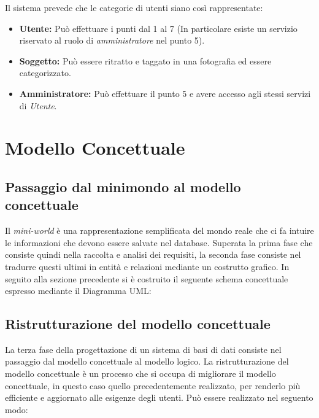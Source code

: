 \documentclass[a4paper,12pt,oneside]{book}
\begin{document}
    Il sistema prevede che le categorie di utenti siano così rappresentate:
    \begin{itemize}
        \item \textbf{Utente:} Può effettuare i punti dal 1 al 7 (In particolare esiste un servizio riservato al ruolo di \emph{amministratore} nel punto 5).

        \item \textbf{Soggetto:} Può essere ritratto e taggato in una fotografia ed essere categorizzato.

        \item \textbf{Amministratore:} Può effettuare il punto 5 e avere accesso agli stessi servizi di \emph{Utente}.
    \end{itemize} 
    \chapter{Modello Concettuale}
    \section{Passaggio dal minimondo al modello concettuale}\par
    Il \emph{mini-world} è una rappresentazione semplificata del mondo reale che ci fa intuire le informazioni che devono essere salvate nel database.
    Superata la prima fase che consiste quindi nella raccolta e analisi dei requisiti, la seconda fase consiste nel tradurre questi ultimi in entità e relazioni mediante un costrutto grafico.
    In seguito alla sezione precedente si è costruito il seguente schema concettuale espresso mediante il Diagramma UML:
    
    \section{Ristrutturazione del modello concettuale}
      La terza fase della progettazione di un sistema di basi di dati consiste nel passaggio dal modello concettuale al modello logico. La ristrutturazione del modello concettuale è un processo che si occupa di migliorare il modello concettuale, in questo caso quello precedentemente realizzato, per renderlo più efficiente e aggiornato alle esigenze degli utenti. Può essere realizzato nel seguento modo:

      \iffalse
      \begin{figure}
          \centering         \texttt{[image: C:/Users/user/Pictures/miafoto]}
          \caption{Caption}
          \label[width=0.7\linewidth]{fig:my_label}
      \end{figure}
      \fi
\end{document}
